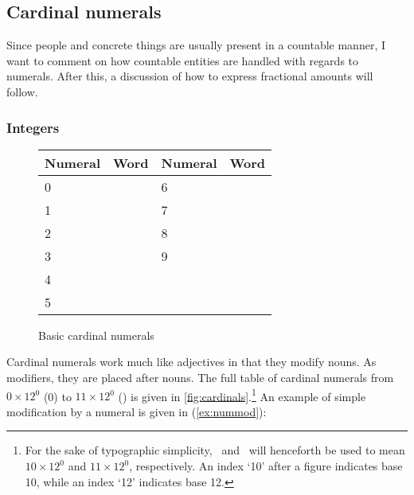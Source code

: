 \subsection{Cardinal numerals}

Since people and concrete things are usually present in a countable manner, I
want to comment on how countable entities are handled with regards to numerals.
After this, a discussion of how to express fractional amounts will follow.

\subsubsection{Integers}

\begin{figure}[tp]\centering
\caption{Basic cardinal numerals}
\begin{tabu} to .75\linewidth {X[c] X[c] X[c] X[c]}
\toprule\tableheaderfont
Numeral
	& Word
	& Numeral
	& Word
	\\
\toprule

0
	& 
	& 6
	& 
	\\

1
	& 
	& 7
	& 
	\\
	
2
	& 
	& 8
	& 
	\\
	
3
	& 
	& 9
	& 
	\\

4
	& 
	& \ten
	& 
	\\

5
	& 
	& \elv
	& 
	\\

\bottomrule
\end{tabu}
\label{fig:cardinals}
\end{figure}

Cardinal numerals work much like adjectives in that they modify nouns. As
modifiers, they are placed after nouns. The full table of cardinal numerals
from $0 \times 12^0$ (0) to $11 \times 12^0$ (\elv) is given in
\autoref{fig:cardinals}.\footnote{For the sake of typographic simplicity, \ten\
and \elv\ will henceforth be used to mean $10 \times 12^0$ and $11 \times
12^0$, respectively. An index `10' after a figure indicates base 10, while an
index `12' indicates base 12.} An example of simple modification by a numeral
is given in (\ref{ex:nummod}):

